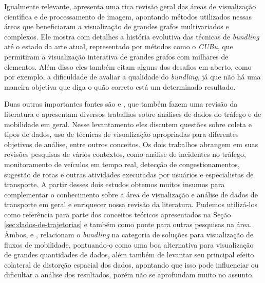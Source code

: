 Igualmente relevante, \citet{Telea2018} apresenta uma rica revisão geral das
áreas de visualização científica e de processamento de imagem, apontando métodos
utilizados nessas áreas que beneficiaram a visualização de grandes grafos
multivariados e complexos. Ele mostra com detalhes a história evolutiva das
técnicas de \emph{bundling} até o estado da arte atual, representado por métodos como o
\emph{CUBu}, que permitiram a visualização interativa de grandes grafos com
milhares de elementos. Além disso eles também citam alguns dos desafios em
aberto, como por exemplo, a dificuldade de avaliar a qualidade do
\emph{bundling}, já que não há uma maneira objetiva que diga o quão correto está
um determinado resultado.

Duas outras importantes fontes são \citet{Chen2015} e
\citet{Andrienko2017Visual}, que também fazem uma revisão da literatura e
apresentam diversos trabalhos sobre análises de dados do tráfego e de mobilidade
em geral. Nesse levantamento eles discutem questões sobre coleta e tipos de
dados, uso de técnicas de visualização apropriadas para diferentes objetivos de
análise, entre outros conceitos. Os dois trabalhos abrangem em suas revisões
pesquisas de vários contextos, como análise de incidentes no tráfego,
monitoramento de veículos em tempo real, detecção de congestionamentos, sugestão
de rotas e outras atividades executadas por usuários e especialistas de
transporte. A partir desses dois estudos obtemos muitos insumos para
complementar o conhecimento sobre a área de visualização e análise de dados de
transporte em geral e enriquecer nossa revisão da literatura. Pudemos
utilizá-los como referência para parte dos conceitos teóricos apresentados na
Seção \ref{sec:dados-de-trajetorias} e também como ponte para outras pesquisas
na área. Âmbos, \citet{Chen2015} e \citet{Andrienko2017Visual}, relacionam o
\emph{bundling} na categoria de soluções para visualização de fluxos de
mobilidade, pontuando-o como uma boa alternativa para visualização de grandes
quantidades de dados, além também de levantar seu principal efeito colateral de
distorção espacial dos dados, apontando que isso pode influenciar ou dificultar
a análise dos resultados, porém não se aprofundam muito no assunto.

